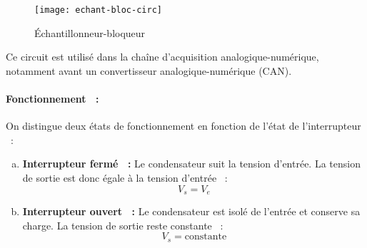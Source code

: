 \begin{figure}[H]
    \centering
    \texttt{[image: echant-bloc-circ]}
    \caption{\'Echantillonneur-bloqueur}
    \label{figEchantillonneur}
\end{figure}

Ce circuit est utilisé dans la chaîne d'acquisition analogique-numérique, notamment avant un convertisseur analogique-numérique (CAN).

\paragraph{Fonctionnement ~:}
On distingue deux états de fonctionnement en fonction de l'état de l'interrupteur ~:

\begin{enumerate}[(a)]
    \item \textbf{Interrupteur fermé ~:} Le condensateur suit la tension d'entrée. La tension de sortie est donc égale à la tension d'entrée ~:\\
    \[
        V_s = V_e
    \]
    
    \item \textbf{Interrupteur ouvert ~:} Le condensateur est isolé de l'entrée et conserve sa charge. La tension de sortie reste constante ~:\\
    \[
        V_s = \text{constante}
    \]
\end{enumerate}